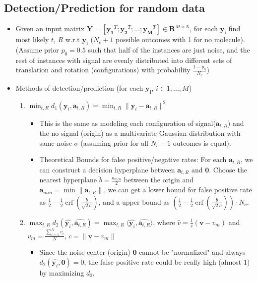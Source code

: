 \documentclass[11pt]{article}
\newcommand{\by}{\boldsymbol{y}}
\newcommand{\ba}{\boldsymbol{a}}
\DeclareMathOperator{\erf}{erf}
\begin{document}
    \subsection{Detection/Prediction for random data}
    \begin{itemize}
        \item Given an input matrix $\mathbf{Y} = [\mathbf{y_1}^T; \mathbf{y_2}^T; ...; \mathbf{y_M}^T] \in \mathbf{R}^{M\times N}$, for each $\mathbf{y_i}$ find most likely $t$, $R$ w.r.t $\mathbf{y_i}$ ($N_c+1$ possible outcomes with 1 for no molecule). (Assume prior $p_0=0.5$ such that half of the instances are just noise, and the rest of instances with signal are evenly distributed into different sets of translation and rotation (configurations) with probability $\frac{1-p_0}{N_c}$)
        \item Methods of detection/prediction (for each $\mathbf{y_i}$, $i \in {1,...,M}$)
        \begin{enumerate}
        \item $\min_{t,R} d_{1}(\by_i,\mathbf{a}_{t,R}) = \min_{t, R} \lVert \by_i- \mathbf{a}_{t,R}\rVert^2$
        \begin{itemize}
            \item This is the same as modeling each configuration of signal($\mathbf{a}_{t,R}$) and the no signal (origin) as a multivariate Gaussian distribution with same noise $\sigma$ (assuming prior for all $N_c+1$ outcomes is equal).
            \item Theoretical Bounds for false positive/negative rates: For each $\mathbf{a}_{t,R}$, we can construct a decision hyperplane between $\mathbf{a}_{t,R}$ and $\mathbf{0}$. Choose the nearest hyperplane $\widetilde{b} = \frac{a_{min}}{2}$ between the origin and $\mathbf{a}_{min} = \min{\lVert  \mathbf{a}_{t,R}\rVert}$, we can get a lower bound for false positive rate as $\frac{1}{2} - \frac{1}{2} \erf(\frac{\widetilde{b}}{\sqrt{2}\sigma})$, and a upper bound as $(\frac{1}{2} - \frac{1}{2} \erf(\frac{\widetilde{b}}{\sqrt{2}\sigma}))\cdot N_c$.
        \end{itemize}
        \item $\max_{t,R} d_{2}(\hat{\by_i}, \hat{\ba_{t,R}}) = \max_{t,R} \langle \hat{\by_i}, \hat{\ba_{t,R}} \rangle$, where $\hat{v} = \frac{1}{c}(\mathbf{v} - v_m)$ and $v_m = \frac{\sum_{i=1}^N v_i}{N}$, $c = \lVert \mathbf{v}- v_m\rVert$
        \begin{itemize}
            \item Since the noise center (origin) $\mathbf{0}$ cannot be "normalized" and always $d_{2}(\hat{\by_i}, \mathbf{0})=0$, the false positive rate could be really high (almost $1$) by maximizing $d_2$.

\end{itemize}
\end{enumerate}
\end{itemize}
\end{document}
